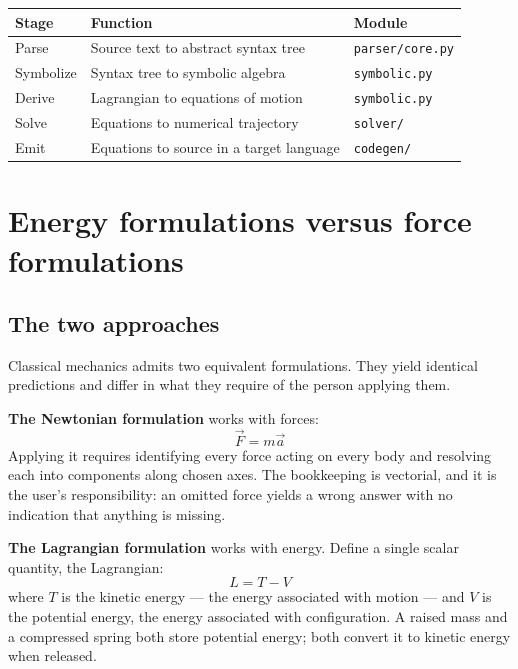 \documentclass[11pt,a4paper]{article}
\newcommand{\code}[1]{\texttt{#1}}
\begin{document}
\begin{center}
\begin{tabular}{@{}lL{7.4cm}l@{}}
\toprule
\textbf{Stage} & \textbf{Function} & \textbf{Module} \\
\midrule
Parse      & Source text to abstract syntax tree        & \code{parser/core.py} \\
Symbolize  & Syntax tree to symbolic algebra            & \code{symbolic.py} \\
Derive     & Lagrangian to equations of motion          & \code{symbolic.py} \\
Solve      & Equations to numerical trajectory          & \code{solver/} \\
Emit       & Equations to source in a target language   & \code{codegen/} \\
\bottomrule
\end{tabular}
\end{center}

\section{Energy formulations versus force formulations}
\label{sec:formulations}

\subsection{The two approaches}

Classical mechanics admits two equivalent formulations. They yield identical predictions and differ
in what they require of the person applying them.

\medskip
\noindent\textbf{The Newtonian formulation} works with forces:
\begin{equation}
\vec{F} = m\vec{a}
\end{equation}
Applying it requires identifying every force acting on every body and resolving each into components
along chosen axes. The bookkeeping is vectorial, and it is the user's responsibility: an omitted
force yields a wrong answer with no indication that anything is missing.

\medskip
\noindent\textbf{The Lagrangian formulation} works with energy. Define a single scalar quantity, the
Lagrangian:
\begin{equation}
L = T - V
\end{equation}
where $T$ is the kinetic energy --- the energy associated with motion --- and $V$ is the potential
energy, the energy associated with configuration. A raised mass and a compressed spring both store
potential energy; both convert it to kinetic energy when released.
\end{document}
